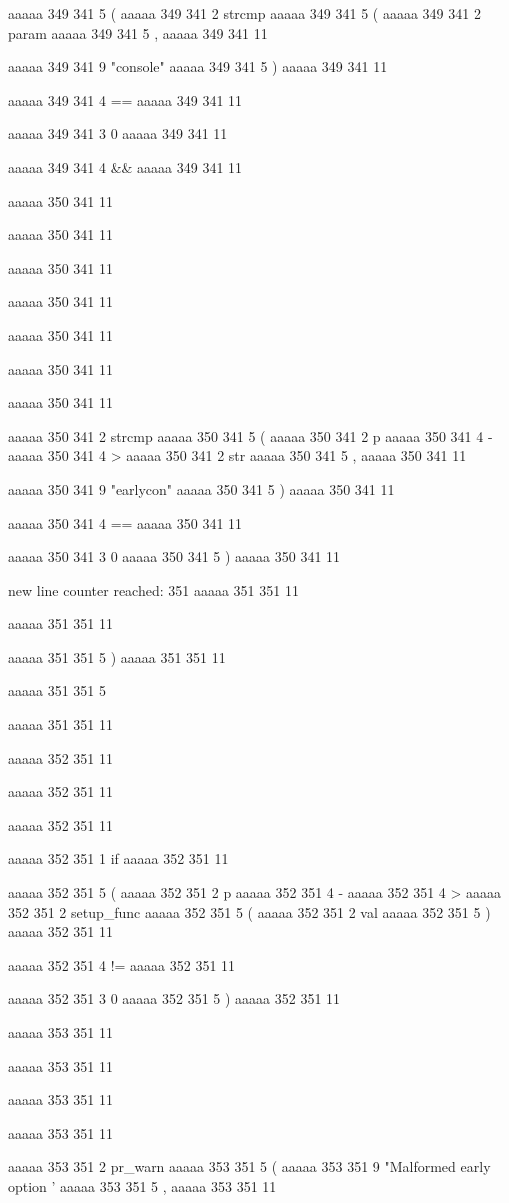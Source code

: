{{aaaaa 349 341
5
(
aaaaa 349 341
2
strcmp
aaaaa 349 341
5
(
aaaaa 349 341
2
param
aaaaa 349 341
5
,
aaaaa 349 341
11
 
aaaaa 349 341
9
"console"
aaaaa 349 341
5
)
aaaaa 349 341
11
 
aaaaa 349 341
4
==
aaaaa 349 341
11
 
aaaaa 349 341
3
0
aaaaa 349 341
11
 
aaaaa 349 341
4
&&
aaaaa 349 341
11


aaaaa 350 341
11
	
aaaaa 350 341
11
	
aaaaa 350 341
11
 
aaaaa 350 341
11
 
aaaaa 350 341
11
 
aaaaa 350 341
11
 
aaaaa 350 341
11
 
aaaaa 350 341
2
strcmp
aaaaa 350 341
5
(
aaaaa 350 341
2
p
aaaaa 350 341
4
-
aaaaa 350 341
4
>
aaaaa 350 341
2
str
aaaaa 350 341
5
,
aaaaa 350 341
11
 
aaaaa 350 341
9
"earlycon"
aaaaa 350 341
5
)
aaaaa 350 341
11
 
aaaaa 350 341
4
==
aaaaa 350 341
11
 
aaaaa 350 341
3
0
aaaaa 350 341
5
)
aaaaa 350 341
11


new line counter reached: 351
aaaaa 351 351
11
	
aaaaa 351 351
11
	
aaaaa 351 351
5
)
aaaaa 351 351
11
 
aaaaa 351 351
5
{
aaaaa 351 351
11


aaaaa 352 351
11
	
aaaaa 352 351
11
	
aaaaa 352 351
11
	
aaaaa 352 351
1
if
aaaaa 352 351
11
 
aaaaa 352 351
5
(
aaaaa 352 351
2
p
aaaaa 352 351
4
-
aaaaa 352 351
4
>
aaaaa 352 351
2
setup_func
aaaaa 352 351
5
(
aaaaa 352 351
2
val
aaaaa 352 351
5
)
aaaaa 352 351
11
 
aaaaa 352 351
4
!=
aaaaa 352 351
11
 
aaaaa 352 351
3
0
aaaaa 352 351
5
)
aaaaa 352 351
11


aaaaa 353 351
11
	
aaaaa 353 351
11
	
aaaaa 353 351
11
	
aaaaa 353 351
11
	
aaaaa 353 351
2
pr_warn
aaaaa 353 351
5
(
aaaaa 353 351
9
"Malformed early option '%
aaaaa 353 351
5
,
aaaaa 353 351
11
 
}}}
